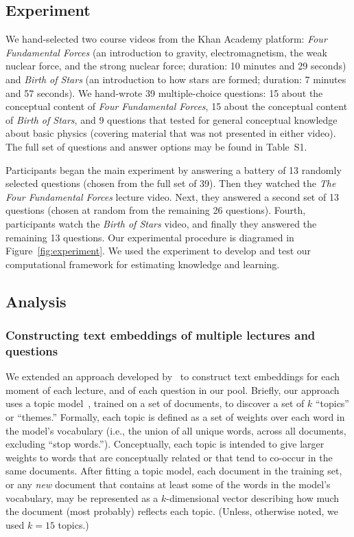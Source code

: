 \documentclass[10pt]{article}
\newcommand{\questions}{S1}
\begin{document}
\subsection*{Experiment}

We hand-selected two course videos from the Khan Academy platform: \textit{Four
Fundamental Forces} (an introduction to gravity, electromagnetism, the weak
nuclear force, and the strong nuclear force; duration: 10 minutes and 29
seconds) and \textit{Birth of Stars} (an introduction to how stars are formed;
duration: 7 minutes and 57 seconds). We hand-wrote 39 multiple-choice
questions: 15 about the conceptual content of \textit{Four Fundamental Forces},
15 about the conceptual content of \textit{Birth of Stars}, and 9
questions that tested for general conceptual knowledge about basic physics
(covering material that was not presented in either video). The full set of
questions and answer options may be found in Table~\questions.



Participants began the main experiment by answering a battery of 13 randomly
selected questions (chosen from the full set of 39). Then they watched the
\textit{The Four Fundamental Forces} lecture video. Next, they answered a second set of
13 questions (chosen at random from the remaining 26 questions). Fourth,
participants watch the \textit{Birth of Stars} video, and finally they answered
the remaining 13 questions. Our experimental procedure is diagramed in
Figure~\ref{fig:experiment}. We used the experiment to develop and test our
computational framework for estimating knowledge and learning.

\subsection*{Analysis}

\subsubsection*{Constructing text embeddings of multiple lectures and questions}\label{subsec:topic-modeling}

We extended an approach developed by~\citep{HeusEtal21} to construct text
embeddings for each moment of each lecture, and of each question in our pool.
Briefly, our approach uses a topic model~\citep{BleiEtal03}, trained on a set
of documents, to discover a set of $k$ ``topics'' or ``themes.'' Formally, each
topic is defined as a set of weights over each word in the model's vocabulary
(i.e., the union of all unique words, across all documents, excluding ``stop
words.''). Conceptually, each topic is intended to give larger weights to words
that are conceptually related or that tend to co-occur in the same documents.
After fitting a topic model, each document in the training set, or any
\textit{new} document that contains at least some of the words in the model's
vocabulary, may be represented as a $k$-dimensional vector describing how much
the document (most probably) reflects each topic. (Unless, otherwise noted, we
used $k = 15$ topics.)
\end{document}
